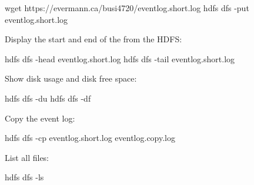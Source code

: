 \begin{bashcode}
wget https://evermann.ca/busi4720/eventlog.short.log
hdfs dfs -put eventlog.short.log
\end{bashcode}

Display the start and end of the from the HDFS:
\begin{bashcode}
hdfs dfs -head eventlog.short.log
hdfs dfs -tail eventlog.short.log
\end{bashcode}

Show disk usage and disk free space:
\begin{bashcode}
hdfs dfs -du
hdfs dfs -df
\end{bashcode}

Copy the event log:
\begin{bashcode}
hdfs dfs -cp eventlog.short.log eventlog.copy.log
\end{bashcode}

List all files:
\begin{bashcode}
hdfs dfs -ls
\end{bashcode}


